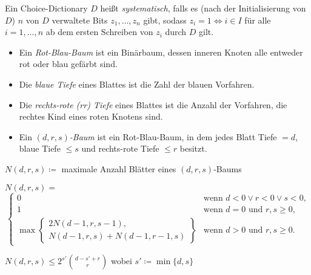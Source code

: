 \documentclass{cheat-sheet}
\begin{document}

\begin{defn}
  Ein Choice-Dictionary $D$ heißt \emph{systematisch}, falls es (nach der Initialisierung von $D$) $n$ von $D$ verwaltete Bits $z_1, \ldots, z_n$ gibt, sodass $z_i = 1 \iff i \in I$ für alle $i = 1, \ldots, n$ ab dem ersten Schreiben von $z_i$ durch $D$ gilt.
\end{defn}

\begin{defn}
  \begin{itemize}
    \item Ein \emph{Rot-Blau-Baum} ist ein Binärbaum, dessen inneren Knoten alle entweder rot oder blau gefärbt sind.
    \item Die \emph{blaue Tiefe} eines Blattes ist die Zahl der blauen Vorfahren.
    \item Die \emph{rechts-rote (rr) Tiefe} eines Blattes ist die Anzahl der Vorfahren, die rechtes Kind eines roten Knotens sind.
    \item Ein \emph{$(d, r, s)$-Baum} ist ein Rot-Blau-Baum, in dem jedes Blatt Tiefe $= d$, blaue Tiefe $\leq s$ und rechts-rote Tiefe $\leq r$ besitzt.
  \end{itemize}
\end{defn}

\begin{nota}
  $N(d, r, s) \coloneqq$ maximale Anzahl Blätter eines $(d, r, s)$-Baums
\end{nota}

\begin{lem}
  $N(d, r, s) =$
  \[
    \begin{cases}
      0 & \text{wenn $d < 0 \vee r < 0 \vee s < 0$,} \\
      1 & \text{wenn $d = 0$ und $r, s \geq 0$,} \\
      \max \left\{
        \begin{array}{l}
          2 N(d-1, r, s-1), \\
          N(d{-}1, r, s) + N(d{-}1, r{-}1, s)
        \end{array}
      \right\} & \text{wenn $d > 0$ und $r, s \geq 0$.}
    \end{cases}
  \]
\end{lem}

\begin{lem}
  $N(d, r, s) \leq 2^{s'} {d - s' + r \choose r}$ \enspace
  wobei $s' \coloneqq \min \{ d, s \}$
\end{lem}
\end{document}
